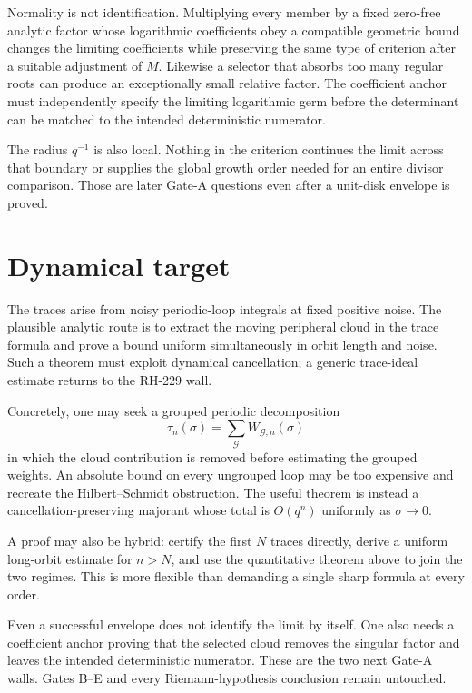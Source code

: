 \documentclass[11pt]{article}
\theoremstyle{remark}
\begin{document}
Normality is not identification.  Multiplying every member by a fixed
zero-free analytic factor whose logarithmic coefficients obey a compatible
geometric bound changes the limiting coefficients while preserving the same
type of criterion after a suitable adjustment of $M$.  Likewise a selector
that absorbs too many regular roots can produce an exceptionally small
relative factor.  The coefficient anchor must independently specify the
limiting logarithmic germ before the determinant can be matched to the
intended deterministic numerator.

The radius $q^{-1}$ is also local.  Nothing in the criterion continues the
limit across that boundary or supplies the global growth order needed for an
entire divisor comparison.  Those are later Gate-A questions even after a
unit-disk envelope is proved.

\section{Dynamical target}

The traces arise from noisy periodic-loop integrals at fixed positive noise.
The plausible analytic route is to extract the moving peripheral cloud in
the trace formula and prove a bound uniform simultaneously in orbit length
and noise.  Such a theorem must exploit dynamical cancellation; a generic
trace-ideal estimate returns to the RH-229 wall.

Concretely, one may seek a grouped periodic decomposition
\[
 \tau_n(\sigma)=\sum_{\mathcal G}W_{\mathcal G,n}(\sigma)
\]
in which the cloud contribution is removed before estimating the grouped
weights.  An absolute bound on every ungrouped loop may be too expensive and
recreate the Hilbert--Schmidt obstruction.  The useful theorem is instead a
cancellation-preserving majorant whose total is $O(q^n)$ uniformly as
$\sigma\to0$.

A proof may also be hybrid: certify the first $N$ traces directly, derive a
uniform long-orbit estimate for $n>N$, and use the quantitative theorem above
to join the two regimes.  This is more flexible than demanding a single
sharp formula at every order.

Even a successful envelope does not identify the limit by itself.  One also
needs a coefficient anchor proving that the selected cloud removes the
singular factor and leaves the intended deterministic numerator.  These are
the two next Gate-A walls.  Gates B--E and every Riemann-hypothesis conclusion
remain untouched.



\end{document}
